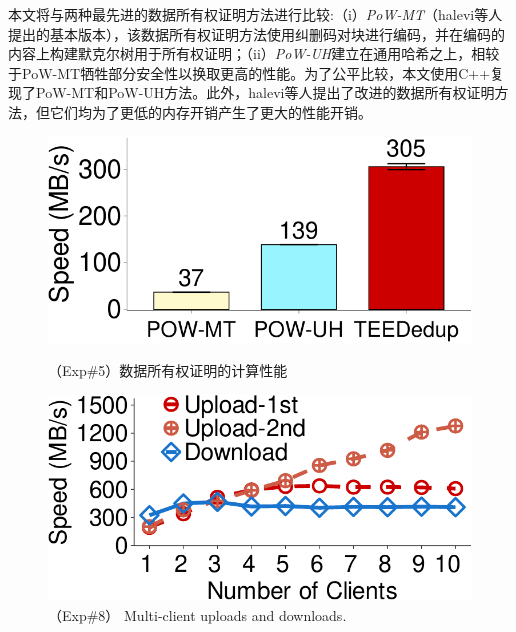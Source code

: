 本文将\sysnameS 与两种最先进的数据所有权证明方法进行比较:（i）\textit{PoW-MT}\cite{halevi11}（halevi等人提出的基本版本），该数据所有权证明方法使用纠删码对块进行编码，并在编码的内容上构建默克尔树用于所有权证明；（ii）\textit{PoW-UH}\cite{xu2013weak}建立在通用哈希之上，相较于PoW-MT牺牲部分安全性以换取更高的性能。为了公平比较，本文使用C++复现了PoW-MT和PoW-UH方法。此外，halevi等人\cite{halevi11}提出了改进的数据所有权证明方法，但它们均为了更低的内存开销产生了更大的性能开销。

\begin{figure}[!htb]
    \begin{minipage}[t]{0.47\textwidth}
        \centering
        \includegraphics[width=\linewidth]{pic/sgxdedup/expa4_powPerformance.pdf}
        \caption{\small（Exp\#5）数据所有权证明的计算性能}
        \label{fig:sgxdedup-pow-comparison}
        \end{minipage}%
    \hspace{0.2in}
    \begin{minipage}[t]{0.47\textwidth}
        \centering
        \includegraphics[width=\linewidth]{pic/sgxdedup/expb1_multiple_client.pdf}  
        \caption{（Exp\#8） Multi-client uploads and downloads.}
        \label{fig:sgxdedup-multiClientThroughput}
    \end{minipage}%
\end{figure}

